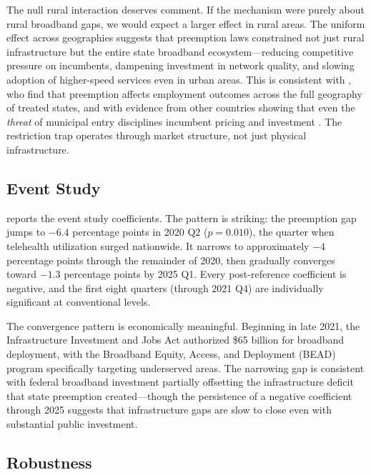 \documentclass[12pt]{article}
\begin{document}
The null rural interaction deserves comment. If the mechanism were purely about rural broadband gaps, we would expect a larger effect in rural areas. The uniform effect across geographies suggests that preemption laws constrained not just rural infrastructure but the entire state broadband ecosystem---reducing competitive pressure on incumbents, dampening investment in network quality, and slowing adoption of higher-speed services even in urban areas. This is consistent with \citet{beland2020municipal}, who find that preemption affects employment outcomes across the full geography of treated states, and with evidence from other countries showing that even the \textit{threat} of municipal entry disciplines incumbent pricing and investment \citep{gillett2006municipal}. The restriction trap operates through market structure, not just physical infrastructure.



\subsection{Event Study}

 reports the event study coefficients. The pattern is striking: the preemption gap jumps to $-6.4$ percentage points in 2020 Q2 ($p = 0.010$), the quarter when telehealth utilization surged nationwide. It narrows to approximately $-4$ percentage points through the remainder of 2020, then gradually converges toward $-1.3$ percentage points by 2025 Q1. Every post-reference coefficient is negative, and the first eight quarters (through 2021 Q4) are individually significant at conventional levels.

The convergence pattern is economically meaningful. Beginning in late 2021, the Infrastructure Investment and Jobs Act authorized \$65 billion for broadband deployment, with the Broadband Equity, Access, and Deployment (BEAD) program specifically targeting underserved areas. The narrowing gap is consistent with federal broadband investment partially offsetting the infrastructure deficit that state preemption created---though the persistence of a negative coefficient through 2025 suggests that infrastructure gaps are slow to close even with substantial public investment.



\subsection{Robustness}
\end{document}
